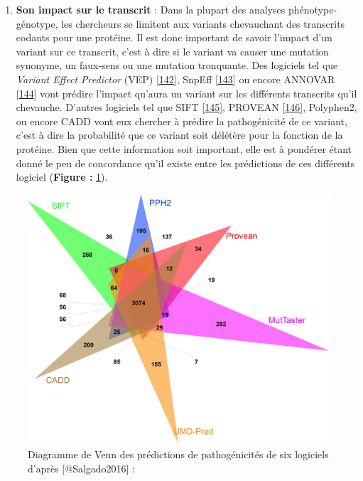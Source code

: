 \documentclass[12pt,twoside]{reedthesis}
\providecommand{\tightlist}{%
  \setlength{\itemsep}{0pt}\setlength{\parskip}{0pt}}
\theoremstyle{definition}
\theoremstyle{definition}
\theoremstyle{remark}
\begin{document}
  \begin{enumerate}
  \def\labelenumi{\alph{enumi}.}
  \setcounter{enumi}{2}
  \tightlist
  \item
    \textbf{Son impact sur le transcrit} : Dans la plupart des analyses
    phénotype-génotype, les chercheurs se limitent aux variants
    chevauchant des transcrits codants pour une protéine. Il est donc
    important de savoir l'impact d'un variant sur ce transcrit, c'est à
    dire si le variant va causer une mutation synonyme, un faux-sens ou
    une mutation tronquante. Des logiciels tel que \emph{Variant Effect
    Predictor} (VEP) {[}\protect\hyperlink{ref-McLaren2016}{142}{]},
    SnpEff {[}\protect\hyperlink{ref-Cingolani2012}{143}{]} ou encore
    ANNOVAR {[}\protect\hyperlink{ref-Wang2010}{144}{]} vont prédire
    l'impact qu'aura un variant sur les différents transcrits qu'il
    chevauche. D'autres logiciels tel que SIFT
    {[}\protect\hyperlink{ref-Kumar2009}{145}{]}, PROVEAN
    {[}\protect\hyperlink{ref-Choi2012}{146}{]}, Polyphen2, ou encore CADD
    vont eux chercher à prédire la pathogénicité de ce variant, c'est à
    dire la probabilité que ce variant soit délétère pour la fonction de
    la protéine. Bien que cette information soit important, elle est à
    pondérer étant donné le peu de concordance qu'il existe entre les
    prédictions de ces différents logiciel (\textbf{Figure :}
    \ref{fig:vennpred}).
  \end{enumerate}
  
  \begin{figure}
  
  {\centering \includegraphics[scale=.7]{figure/venn_Diag_patho_pred} 
  
  }
  
  \caption[Diagramme de Venn des prédictions de pathogénicités de six logiciels]{Diagramme de Venn des prédictions de pathogénicités de six logiciels d'après [@Salgado2016] : }\label{fig:vennpred}
  \end{figure}
  
\end{document}
